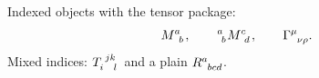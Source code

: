 \documentclass{article}
\begin{document}
Indexed objects with the tensor package:
\[
  \tensor{M}{^a_b}, \qquad \tensor[^a_b]{M}{^c_d}, \qquad \tensor{\Gamma}{^\mu_{\nu\rho}}.
\]
Mixed indices: $\tensor{T}{_i^j^k_l}$ and a plain $\tensor{R}{^a_{bcd}}$.
\end{document}
